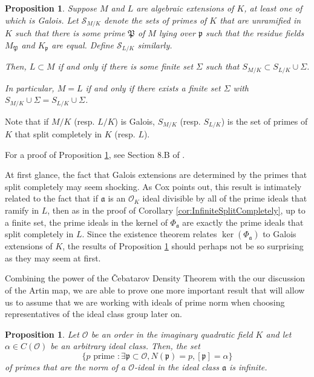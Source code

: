 \documentclass{amsart}
\newtheorem{prop}[thm]{Proposition}
\theoremstyle{definition}
\theoremstyle{remark}
\numberwithin{equation}{section}
\newcommand{\cO}{\mathcal O}
\newcommand{\cS}{\mathcal S}
\newcommand{\fka}{\mathfrak a}
\newcommand{\fkp}{\mathfrak p}
\newcommand{\fkP}{\mathfrak{P}}
\begin{document}
\begin{prop} \label{prop:ExtensionDeterminedByPrimes}
Suppose $M$ and $L$ are algebraic extensions of $K$, at least one of which is Galois. Let $\cS_{M/K}$ denote the sets of primes of $K$ that are unramified in $K$ such that there is some prime $\fkP$ of $M$ lying over $\fkp$ such that the residue fields $M_{\fkP}$ and $K_{\fkp}$ are equal. Define $\cS_{L/K}$ similarly. %

Then, $L \subset M$ if and only if there is some finite set $\Sigma$ such that $S_{M/K} \subset S_{L/K} \cup \Sigma$.

 In particular, $M = L$ if and only if there exists a finite set $\Sigma$ with $S_{M/K} \cup \Sigma = S_{L/K} \cup \Sigma$.
\end{prop}
 
 Note that if $M/K$ (resp. $L/K$) is Galois, $S_{M/K}$ (resp. $S_{L/K}$) is the set of primes of $K$ that split completely in $K$ (resp. $L$).  
 
 For a proof of Proposition \ref{prop:ExtensionDeterminedByPrimes}, see Section 8.B of \cite{CoxPrimes}.

At first glance, the fact that Galois extensions are determined by the primes that split completely may seem shocking. As Cox points out, this result is intimately related to the fact that if $\fka$ is an $\cO_{K}$ ideal divisible by all of the prime ideals that ramify in $L$, then as in the proof of Corollary \ref{cor:InfiniteSplitCompletely}, up to a finite set, the prime ideals in the kernel of $\Phi_{\fka}$ are exactly the prime ideals that split completely in $L$. Since the existence theorem relates $\ker(\Phi_{\fka})$ to Galois extensions of $K$, the results of Proposition \ref{prop:ExtensionDeterminedByPrimes} should perhaps not be so surprising as they may seem at first.

Combining the power of the \v{C}ebatarov Density Theorem with the our discussion of the Artin map, we are able to prove one more important result that will allow us to assume that we are working with ideals of prime norm when choosing representatives of the ideal class group later on.

\begin{prop} \label{prop:EveryIdealClassHasPrimes}
Let $\cO$ be an order in the imaginary quadratic field $K$ and let $\alpha \in C(\cO)$ be an arbitrary ideal class. Then, the set 
\[
\{ p \text{ prime } : \exists \fkp \subset \cO, N(\fkp) = p, [\fkp] = \alpha\}
\]
of primes that are the norm of a $\cO$-ideal in the ideal class $\fka$ is infinite.
\end{prop}
\end{document}
